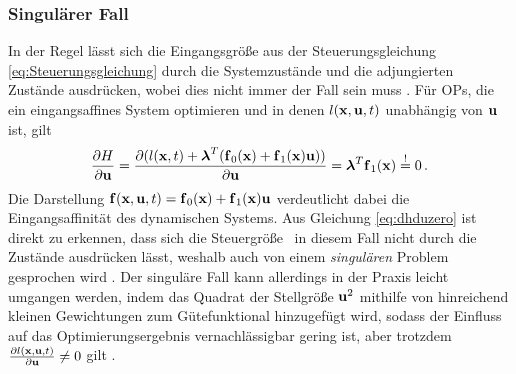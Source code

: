 \subsubsection{Singulärer Fall}\label{subsubsec:Singularität}
In der Regel lässt sich die Eingangsgröße aus der Steuerungsgleichung \eqref{eq:Steuerungsgleichung} durch die Systemzustände und die adjungierten Zustände ausdrücken, wobei dies nicht immer der Fall sein muss \cite{KnutGraichen.2012}. Für \gls{OP}s, die ein eingangsaffines System optimieren und in denen $l(\boldsymbol{\mathrm{x}},\boldsymbol{\mathrm{u}},t)$ unabhängig von $\boldsymbol{\mathrm{u}}$ ist, gilt 
\begin{equation}
	\frac{\partial H}{\partial \boldsymbol{\mathrm{u}}} = \frac{\partial (l(\boldsymbol{\mathrm{x}},t) + \boldsymbol{\mathrm{\lambda}}^T(\boldsymbol{\mathrm{f}}_0(\boldsymbol{\mathrm{x}})+\boldsymbol{\mathrm{f}}_1(\boldsymbol{\mathrm{x}})\boldsymbol{\mathrm{u}}))}{\partial \boldsymbol{\mathrm{u}}} = \boldsymbol{\mathrm{\lambda}}^T\boldsymbol{\mathrm{f}}_1(\boldsymbol{\mathrm{x}}) \stackrel{!}{=} 0 \,. \label{eq:dhduzero}
\end{equation}
Die Darstellung $\boldsymbol{\mathrm{f}}(\boldsymbol{\mathrm{x}},\boldsymbol{\mathrm{u}},t) = \boldsymbol{\mathrm{f}}_0(\boldsymbol{\mathrm{x}})+\boldsymbol{\mathrm{f}}_1(\boldsymbol{\mathrm{x}})\boldsymbol{\mathrm{u}}$ verdeutlicht dabei die Eingangsaffinität des dynamischen Systems. Aus Gleichung \eqref{eq:dhduzero} ist direkt zu erkennen, dass sich die Steuergröße \uoft~in diesem Fall nicht durch die Zustände ausdrücken lässt, weshalb auch von einem \textit{singulären} Problem gesprochen wird \cite{KnutGraichen.2012}. Der singuläre Fall kann allerdings in der Praxis leicht umgangen werden, indem das Quadrat der Stellgröße $\boldsymbol{\mathrm{u}}^2$ mithilfe von hinreichend kleinen Gewichtungen zum Gütefunktional hinzugefügt wird, sodass der Einfluss auf das Optimierungsergebnis vernachlässigbar gering ist, aber trotzdem $\frac{\partial l(\boldsymbol{\mathrm{x}},\boldsymbol{\mathrm{u}},t)}{\partial \boldsymbol{\mathrm{u}}} \neq 0$ gilt \cite{KnutGraichen.2012}.
